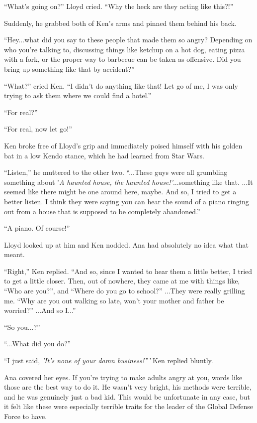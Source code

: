 \documentclass[
]{article}
\begin{document}
``What's going on?'' Lloyd cried. ``Why the heck are they acting like
this?!''

Suddenly, he grabbed both of Ken's arms and pinned them behind his back.

``Hey...what did you say to these people that made them so angry?
Depending on who you're talking to, discussing things like ketchup on a
hot dog, eating pizza with a fork, or the proper way to barbecue can be
taken as offensive. Did you bring up something like that by accident?''

``What?'' cried Ken. ``I didn't do anything like that! Let go of me, I
was only trying to ask them where we could find a hotel.''

``For real?''

``For real, now let go!''

Ken broke free of Lloyd's grip and immediately poised himself with his
golden bat in a low Kendo stance, which he had learned from Star Wars.

``Listen,'' he muttered to the other two. ``...These guys were all
grumbling something about '\emph{A haunted house, the haunted
house!'}...something like that. ...It seemed like there might be one
around here, maybe. And so, I tried to get a better listen. I think they
were saying you can hear the sound of a piano ringing out from a house
that is supposed to be completely abandoned.''

``A piano. Of course!''

Lloyd looked up at him and Ken nodded. Ana had absolutely no idea what
that meant.

``Right,'' Ken replied. ``And so, since I wanted to hear them a little
better, I tried to get a little closer. Then, out of nowhere, they came
at me with things like, ``Who are you?'', and ``Where do you go to
school?'' ...They were really grilling me. ``Why are you out walking so
late, won't your mother and father be worried?'' ...And so I...''

``So you...?''

``...What did you do?''

``I just said, \emph{'It's none of your damn business!'''} Ken replied
bluntly.

Ana covered her eyes. If you're trying to make adults angry at you,
words like those are the best way to do it. He wasn't very bright, his
methods were terrible, and he was genuinely just a bad kid. This would
be unfortunate in any case, but it felt like these were especially
terrible traits for the leader of the Global Defense Force to have.
\end{document}
